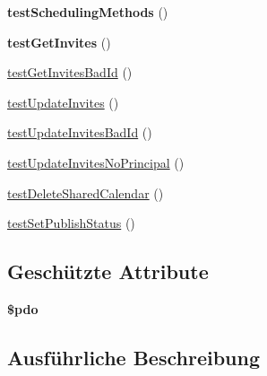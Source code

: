 \begin{DoxyCompactItemize}
\item 
\mbox{\label{class_sabre_1_1_cal_d_a_v_1_1_backend_1_1_abstract_p_d_o_test_a229b4eb31832c8ea782fb97956cb1951}} 
{\bfseries test\+Scheduling\+Methods} ()
\item 
\mbox{\label{class_sabre_1_1_cal_d_a_v_1_1_backend_1_1_abstract_p_d_o_test_ad8b0be54e0414fe3717f2540af77dd05}} 
{\bfseries test\+Get\+Invites} ()
\item 
\mbox{\hyperlink{class_sabre_1_1_cal_d_a_v_1_1_backend_1_1_abstract_p_d_o_test_a8cec5e40223d3f3e3571021cdddbfb72}{test\+Get\+Invites\+Bad\+Id}} ()
\item 
\mbox{\hyperlink{class_sabre_1_1_cal_d_a_v_1_1_backend_1_1_abstract_p_d_o_test_acd3616f503d0f94b0249574c578f9f92}{test\+Update\+Invites}} ()
\item 
\mbox{\hyperlink{class_sabre_1_1_cal_d_a_v_1_1_backend_1_1_abstract_p_d_o_test_af35ae24fa6ee7f0aee43d1ee5dfc1f9e}{test\+Update\+Invites\+Bad\+Id}} ()
\item 
\mbox{\hyperlink{class_sabre_1_1_cal_d_a_v_1_1_backend_1_1_abstract_p_d_o_test_a043098f11f59edc2272c2db65ad73e9d}{test\+Update\+Invites\+No\+Principal}} ()
\item 
\mbox{\hyperlink{class_sabre_1_1_cal_d_a_v_1_1_backend_1_1_abstract_p_d_o_test_a5aa9df9966fe765ba36646f58e7b021a}{test\+Delete\+Shared\+Calendar}} ()
\item 
\mbox{\hyperlink{class_sabre_1_1_cal_d_a_v_1_1_backend_1_1_abstract_p_d_o_test_adb7c70e8c8d25b6fb6d74b5df0b18b37}{test\+Set\+Publish\+Status}} ()
\end{DoxyCompactItemize}
\subsection*{Geschützte Attribute}
\begin{DoxyCompactItemize}
\item 
\mbox{\label{class_sabre_1_1_cal_d_a_v_1_1_backend_1_1_abstract_p_d_o_test_a9eeee80695f9762670d7fe3424ca3328}} 
{\bfseries \$pdo}
\end{DoxyCompactItemize}


\subsection{Ausführliche Beschreibung}


